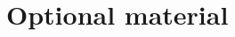 \documentclass[handout,aspectratio=169,11pt]{beamer}
\newif\ifinbackup
\newcommand{\step}[1]{\xrightarrow{#1}}
\newcommand{\wstep}[1]{\xRightarrow{#1}}
\newcommand{\nil}{\mathbf 0}
\newcommand{\optional}{\textcolor{Muted}{\scriptsize OPTIONAL}\quad}
\newcommand{\Store}[2]{\langle #1,\,#2\rangle}
\begin{document}
\appendix
\inbackuptrue
\section{Optional material}

\end{document}
